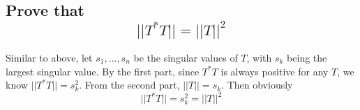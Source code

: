 \documentclass[answers]{exam}
\begin{document}
\begin{questions}
\begin{parts}
	\part{Prove that
		$$||T^*T|| = ||T||^2$$
	}

	\begin{solution}
		Similar to above, let $s_1,\dots,s_n$ be the singular values of $T$, with $s_k$ being the largest singular value. By the first part, since $T^*T$ is always positive for any $T$, we know $||T^*T|| = s_k^2$. From the second part, $||T|| = s_k$. Then obviously
		$$||T^*T|| = s_k^2 = ||T||^2$$
	\end{solution}
\end{parts}

\end{questions}
\end{document}

